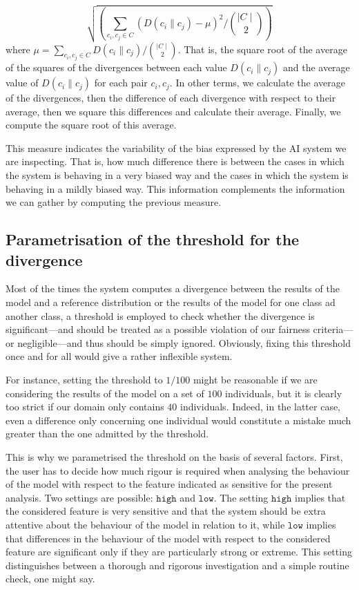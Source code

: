 \documentclass[
]{ceurart}
\begin{document}
\[\sqrt{ (\sum_{c_i,c_j\in C} (D(c_i\parallel c_j)-\mu)^2 / \binom{\mid C\mid}{2}  )}\]
 where  $\mu = \sum_{c_i,c_j\in C} D(c_i\parallel c_j)/\binom{\mid C\mid}{2}$. That is, the square root of the average of the squares of the divergences between each value $D(c_i\parallel c_j)$ and the average value of $D(c_i\parallel c_j)$ for each pair $c_i,c_j$. In other terms,  we calculate the average of the divergences, then the difference of each divergence with respect to their average, then we square this differences and calculate their average. Finally, we compute the square root of this average.

This measure indicates the variability of the bias expressed by the AI system we are inspecting. That is, how much difference there is between the cases in which the system is behaving in a very biased way and the cases in which the system is behaving in a mildly biased way. This information complements the information we can gather by computing the previous measure.

\subsection{Parametrisation of the threshold for the divergence}

Most of the times the system computes a divergence between the results of the model and a reference distribution or the results of the model for one class ad another class, a threshold is employed to check whether the divergence is significant---and should be treated as a possible violation of our fairness criteria---or negligible---and thus should be simply ignored. Obviously, fixing this threshold once and for all would give a rather inflexible system.


For instance, setting the threshold to $1/100$ might be reasonable if we are considering the results of the model on a set of $100$ individuals, but it is clearly too strict if our domain only contains $40$ individuals. Indeed, in the latter case, even a difference only concerning one individual would constitute a mistake much greater than the one admitted by the threshold.   

This is why we parametrised the threshold on the basis of several factors. First, the user has to decide how much rigour is required when analysing the behaviour of the model with respect to the feature indicated as sensitive for the present analysis. Two settings are possible: $\mathtt{high}$ and $\mathtt{low}$. The setting $\mathtt{high}$ implies that the considered feature is very sensitive and that the system should be extra attentive about the behaviour of the model in relation to it, while $\mathtt{low}$ implies that differences in the behaviour of the model with respect to the considered feature are significant only if they are particularly strong or extreme. This setting distinguishes between a thorough and rigorous investigation and a simple routine check, one might say.
\end{document}
